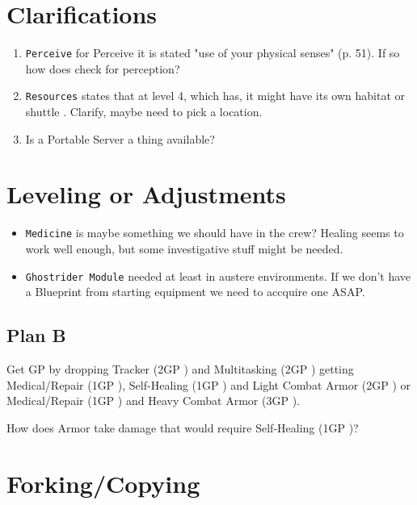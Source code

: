 \section{Clarifications}

\begin{enumerate}
    \item \texttt{Perceive}  for Perceive it is stated "use of your physical senses" (p. 51). If so how does \egr{} check for perception?

    \item \texttt{Resources} states that at level 4, which \egr{} has, it might have its own habitat or shuttle \citep[p. 75]{ep2e_1.1_2019}. Clarify, maybe need to pick a location.

    \item Is a Portable Server a thing available?
\end{enumerate}

\section{Leveling or Adjustments}

\begin{itemize}
    \item \texttt{Medicine} is maybe something we should have in the crew? Healing seems to work well enough, but some investigative stuff might be needed.
    \item \texttt{\gls{Ghostrider Module}} needed at least in austere environments. If we don't have a \gls{Blueprint} from starting equipment we need to accquire one ASAP.
\end{itemize}

\subsection{Plan B}

Get GP by dropping Tracker (2GP \citep[p. 326]{ep2e_1.1_2019}) and Multitasking (2GP \citep[p. 320]{ep2e_1.1_2019}) getting Medical/Repair (1GP \citep[p. 217]{ep2e_1.1_2019}), Self-Healing (1GP \citep[p. 217]{ep2e_1.1_2019}) and Light Combat Armor (2GP \citep[p. 215]{ep2e_1.1_2019}) or Medical/Repair (1GP \citep[p. 217]{ep2e_1.1_2019}) and \gls{Heavy Combat Armor} (3GP \citep[p. 215]{ep2e_1.1_2019}).

How does Armor take damage that would require Self-Healing (1GP \citep[p. 217]{ep2e_1.1_2019})?


\section{Forking/Copying}

